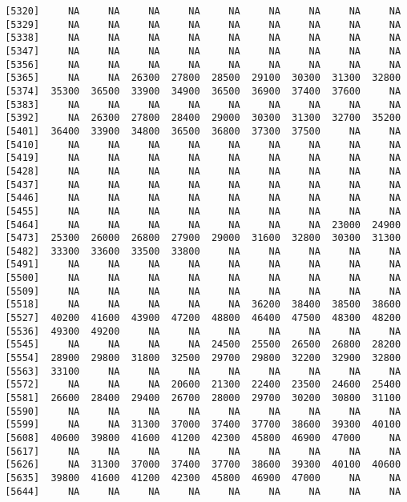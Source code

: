 \documentclass[]{article}
\begin{document}
\begin{verbatim}
 [5320]     NA     NA     NA     NA     NA     NA     NA     NA     NA
 [5329]     NA     NA     NA     NA     NA     NA     NA     NA     NA
 [5338]     NA     NA     NA     NA     NA     NA     NA     NA     NA
 [5347]     NA     NA     NA     NA     NA     NA     NA     NA     NA
 [5356]     NA     NA     NA     NA     NA     NA     NA     NA     NA
 [5365]     NA     NA  26300  27800  28500  29100  30300  31300  32800
 [5374]  35300  36500  33900  34900  36500  36900  37400  37600     NA
 [5383]     NA     NA     NA     NA     NA     NA     NA     NA     NA
 [5392]     NA  26300  27800  28400  29000  30300  31300  32700  35200
 [5401]  36400  33900  34800  36500  36800  37300  37500     NA     NA
 [5410]     NA     NA     NA     NA     NA     NA     NA     NA     NA
 [5419]     NA     NA     NA     NA     NA     NA     NA     NA     NA
 [5428]     NA     NA     NA     NA     NA     NA     NA     NA     NA
 [5437]     NA     NA     NA     NA     NA     NA     NA     NA     NA
 [5446]     NA     NA     NA     NA     NA     NA     NA     NA     NA
 [5455]     NA     NA     NA     NA     NA     NA     NA     NA     NA
 [5464]     NA     NA     NA     NA     NA     NA     NA  23000  24900
 [5473]  25300  26000  26800  27900  29000  31600  32800  30300  31300
 [5482]  33300  33600  33500  33800     NA     NA     NA     NA     NA
 [5491]     NA     NA     NA     NA     NA     NA     NA     NA     NA
 [5500]     NA     NA     NA     NA     NA     NA     NA     NA     NA
 [5509]     NA     NA     NA     NA     NA     NA     NA     NA     NA
 [5518]     NA     NA     NA     NA     NA  36200  38400  38500  38600
 [5527]  40200  41600  43900  47200  48800  46400  47500  48300  48200
 [5536]  49300  49200     NA     NA     NA     NA     NA     NA     NA
 [5545]     NA     NA     NA     NA  24500  25500  26500  26800  28200
 [5554]  28900  29800  31800  32500  29700  29800  32200  32900  32800
 [5563]  33100     NA     NA     NA     NA     NA     NA     NA     NA
 [5572]     NA     NA     NA  20600  21300  22400  23500  24600  25400
 [5581]  26600  28400  29400  26700  28000  29700  30200  30800  31100
 [5590]     NA     NA     NA     NA     NA     NA     NA     NA     NA
 [5599]     NA     NA  31300  37000  37400  37700  38600  39300  40100
 [5608]  40600  39800  41600  41200  42300  45800  46900  47000     NA
 [5617]     NA     NA     NA     NA     NA     NA     NA     NA     NA
 [5626]     NA  31300  37000  37400  37700  38600  39300  40100  40600
 [5635]  39800  41600  41200  42300  45800  46900  47000     NA     NA
 [5644]     NA     NA     NA     NA     NA     NA     NA     NA     NA

\end{verbatim}
\end{document}
